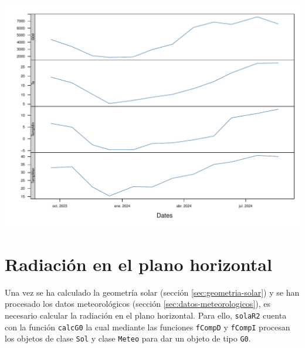 \begin{center}
\includegraphics[width=\textwidth]{figuras/codigo-readsiar.pdf}
\end{center}

\section{Radiación en el plano horizontal}
\label{sec:orgb434c52}
\label{sec:radiacion-plano-horizontal}
Una vez se ha calculado la geometría solar (sección \ref{sec:geometria-solar}) y se han procesado los datos meteorológicos (sección \ref{sec:datos-meteorologicos}), es necesario calcular la radiación en el plano horizontal. Para ello, \texttt{solaR2} cuenta con la función \texttt{calcG0} la cual mediante las funciones \texttt{fCompD} y \texttt{fCompI} procesan los objetos de clase \texttt{Sol} y clase \texttt{Meteo} para dar un objeto de tipo \texttt{G0}.

